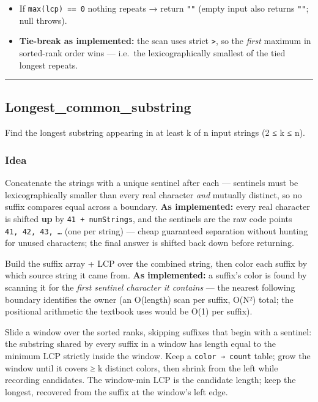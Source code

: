 \documentclass[
  10pt,
  letterpaper,
  onecolumn]{article}
\providecommand{\tightlist}{%
  \setlength{\itemsep}{0pt}\setlength{\parskip}{0pt}}
\begin{document}
\begin{itemize}
\tightlist
\item
  If \texttt{max(lcp)\ ==\ 0} nothing repeats → return \texttt{""}
  (empty input also returns \texttt{""}; null throws).
\item
  \textbf{Tie-break as implemented:} the scan uses strict
  \texttt{\textgreater{}}, so the \emph{first} maximum in sorted-rank
  order wins --- i.e.~the lexicographically smallest of the tied longest
  repeats.
\end{itemize}

\begin{center}\rule{0.5\linewidth}{0.5pt}\end{center}

\hypertarget{longest_common_substring}{%
\subsection{Longest\_common\_substring}\label{longest_common_substring}}

Find the longest substring appearing in at least k of n input strings (2
≤ k ≤ n).

\hypertarget{idea-2}{%
\subsubsection{Idea}\label{idea-2}}

Concatenate the strings with a unique sentinel after each --- sentinels
must be lexicographically smaller than every real character \emph{and}
mutually distinct, so no suffix compares equal across a boundary.
\textbf{As implemented:} every real character is shifted \textbf{up} by
\texttt{41\ +\ numStrings}, and the sentinels are the raw code points
\texttt{41,\ 42,\ 43,\ …} (one per string) --- cheap guaranteed
separation without hunting for unused characters; the final answer is
shifted back down before returning.

Build the suffix array + LCP over the combined string, then color each
suffix by which source string it came from. \textbf{As implemented:} a
suffix's color is found by scanning it for the \emph{first sentinel
character it contains} --- the nearest following boundary identifies the
owner (an O(length) scan per suffix, O(N²) total; the positional
arithmetic the textbook uses would be O(1) per suffix).

Slide a window over the sorted ranks, skipping suffixes that begin with
a sentinel: the substring shared by every suffix in a window has length
equal to the minimum LCP strictly inside the window. Keep a
\texttt{color\ →\ count} table; grow the window until it covers ≥ k
distinct colors, then shrink from the left while recording candidates.
The window-min LCP is the candidate length; keep the longest, recovered
from the suffix at the window's left edge.
\end{document}
